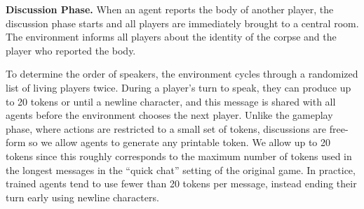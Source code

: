 
\smallskip

\noindent \textbf{Discussion Phase.} When an agent reports the body of another player, the discussion phase starts and all players are immediately brought to a central room. The environment informs all players about the identity of the corpse and the player who reported the body. 

To determine the order of speakers, the environment cycles through a randomized list of living players twice. During a player's turn to speak, they can produce up to 20 tokens or until a newline character, and this message is shared with all agents before the environment chooses the next player. Unlike the gameplay phase, where actions are restricted to a small set of tokens, discussions are free-form so we allow agents to generate any printable token. We allow up to 20 tokens since this roughly corresponds to the maximum number of tokens used in the longest messages in the ``quick chat'' setting of the original \acro game. In practice, trained agents tend to use fewer than 20 tokens per message, instead ending their turn early using newline characters.

